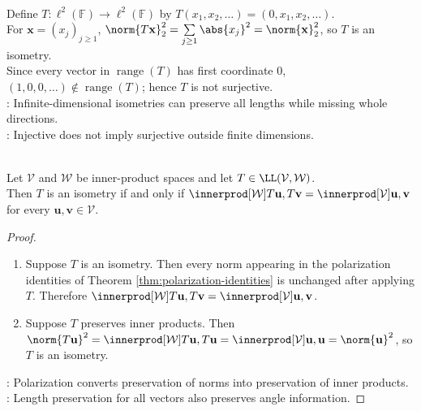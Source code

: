 \begin{example} \label{ex:l2-shift-isometry-not-surjective} \\
Define $T:\ell^2(\mathbb{F})\to\ell^2(\mathbb{F})$ by $T(x_1,x_2,\ldots)=(0,x_1,x_2,\ldots)$.\\
For $\mathbf{x}=(x_j)_{j\geq1}$, $\norm{T\mathbf{x}}_2^2=\sum\limits_{j\geq1}\abs{x_j}^2=\norm{\mathbf{x}}_2^2$, so $T$ is an isometry.\\
Since every vector in $\operatorname{range}(T)$ has first coordinate $0$, $(1,0,0,\ldots)\notin\operatorname{range}(T)$; hence $T$ is not surjective.\\
: Infinite-dimensional isometries can preserve all lengths while missing whole directions.\\
: Injective does not imply surjective outside finite dimensions.
\end{example}

\begin{theorem} \label{thm:isometry-iff-inner-product-preserving} \\
Let $\mathcal{V}$ and $\mathcal{W}$ be inner-product spaces and let $T\in\LL(\mathcal{V},\mathcal{W})$.\\
Then $T$ is an isometry if and only if $\innerprod[\mathcal{W}]{T\mathbf{u},T\mathbf{v}}=\innerprod[\mathcal{V}]{\mathbf{u},\mathbf{v}}$ for every $\mathbf{u},\mathbf{v}\in\mathcal{V}$.
\begin{proof}
\begin{enumerate}[label=\roman*.]
\setlength{\itemsep}{0pt}
\item[$(\Rightarrow)$] Suppose $T$ is an isometry. Then every norm appearing in the polarization identities of Theorem \ref{thm:polarization-identities} is unchanged after applying $T$. Therefore $\innerprod[\mathcal{W}]{T\mathbf{u},T\mathbf{v}}=\innerprod[\mathcal{V}]{\mathbf{u},\mathbf{v}}$.
\item[$(\Leftarrow)$] Suppose $T$ preserves inner products. Then $\norm{T\mathbf{u}}^2=\innerprod[\mathcal{W}]{T\mathbf{u},T\mathbf{u}}=\innerprod[\mathcal{V}]{\mathbf{u},\mathbf{u}}=\norm{\mathbf{u}}^2$, so $T$ is an isometry.
\end{enumerate}
: Polarization converts preservation of norms into preservation of inner products.\\
: Length preservation for all vectors also preserves angle information.
\end{proof}
\end{theorem}

